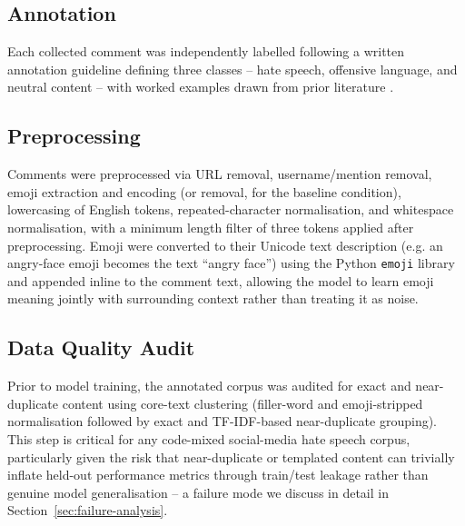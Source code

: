 \documentclass[journal]{IEEEtran}
\begin{document}
\subsection{Annotation}

Each collected comment was independently labelled following a written
annotation guideline defining three classes -- hate speech, offensive
language, and neutral content -- with worked examples drawn from prior
literature \cite{muthuthanthri2024,davidson2017}. %

\subsection{Preprocessing}

Comments were preprocessed via URL removal, username/mention removal,
emoji extraction and encoding (or removal, for the baseline condition),
lowercasing of English tokens, repeated-character normalisation, and
whitespace normalisation, with a minimum length filter of three tokens
applied after preprocessing. Emoji were converted to their Unicode text
description (e.g. an angry-face emoji becomes the text ``angry face'')
using the
Python \texttt{emoji} library and appended inline to the comment text,
allowing the model to learn emoji meaning jointly with surrounding
context rather than treating it as noise.

\subsection{Data Quality Audit}
\label{sec:audit}

Prior to model training, the annotated corpus was audited for exact and
near-duplicate content using core-text clustering (filler-word and
emoji-stripped normalisation followed by exact and TF-IDF-based
near-duplicate grouping). %
This step is critical for any code-mixed social-media hate speech
corpus, particularly given the risk that near-duplicate or templated
content can trivially inflate held-out performance metrics through
train/test leakage rather than genuine model generalisation -- a failure
mode we discuss in detail in Section~\ref{sec:failure-analysis}.
\end{document}
